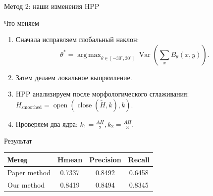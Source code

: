 \documentclass[12pt,pdf,hyperref={unicode}]{beamer}
\newcommand{\argmax}{\mathop{\mathrm{arg\,max}}}
\begin{document}
\begin{frame}{Метод 2: наши изменения HPP}

\small

\begin{block}{Что меняем}
\begin{enumerate}
    \item Сначала исправляем глобальный наклон:
    \[
    \theta^*=\argmax_{\theta\in[-30^\circ,30^\circ]}
    \operatorname{Var}\left(\sum_x B_\theta(x,y)\right).
    \]
    \item Затем делаем локальное выпрямление.
    \item HPP анализируем после морфологического сглаживания:
    $
        H_{\text{smoothed}}
        =
        \operatorname{open}(\operatorname{close}(\tilde H,k),k).
    $
    \item Проверяем два ядра:
    $
        k_1=\frac{AH}{2}, k_2=\frac{AH}{3}.
    $
\end{enumerate}
\end{block}

\vspace{1mm}

\begin{block}{Результат}
\centering
\scriptsize
\begin{tabular}{|l|c|c|c|}
\hline
Метод & Hmean & Precision & Recall \\
\hline
Paper method & 0.7337 & 0.8492 & 0.6458 \\
Our method   & 0.8419 & 0.8494 & 0.8345 \\
\hline
\end{tabular}
\end{block}

\end{frame}
\end{document}
